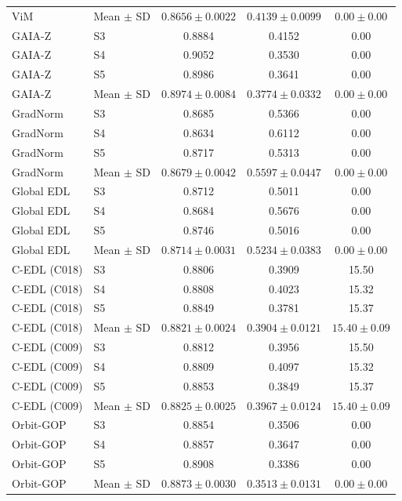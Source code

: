 \begin{longtable}{@{}llccc@{}}
ViM & Mean $\pm$ SD & $0.8656 \pm 0.0022$ & $0.4139 \pm 0.0099$ & $0.00 \pm 0.00$ \\
GAIA-Z & S3 & 0.8884 & 0.4152 & 0.00 \\
GAIA-Z & S4 & 0.9052 & 0.3530 & 0.00 \\
GAIA-Z & S5 & 0.8986 & 0.3641 & 0.00 \\
GAIA-Z & Mean $\pm$ SD & $0.8974 \pm 0.0084$ & $0.3774 \pm 0.0332$ & $0.00 \pm 0.00$ \\
GradNorm & S3 & 0.8685 & 0.5366 & 0.00 \\
GradNorm & S4 & 0.8634 & 0.6112 & 0.00 \\
GradNorm & S5 & 0.8717 & 0.5313 & 0.00 \\
GradNorm & Mean $\pm$ SD & $0.8679 \pm 0.0042$ & $0.5597 \pm 0.0447$ & $0.00 \pm 0.00$ \\
Global EDL & S3 & 0.8712 & 0.5011 & 0.00 \\
Global EDL & S4 & 0.8684 & 0.5676 & 0.00 \\
Global EDL & S5 & 0.8746 & 0.5016 & 0.00 \\
Global EDL & Mean $\pm$ SD & $0.8714 \pm 0.0031$ & $0.5234 \pm 0.0383$ & $0.00 \pm 0.00$ \\
C-EDL (C018) & S3 & 0.8806 & 0.3909 & 15.50 \\
C-EDL (C018) & S4 & 0.8808 & 0.4023 & 15.32 \\
C-EDL (C018) & S5 & 0.8849 & 0.3781 & 15.37 \\
C-EDL (C018) & Mean $\pm$ SD & $0.8821 \pm 0.0024$ & $0.3904 \pm 0.0121$ & $15.40 \pm 0.09$ \\
C-EDL (C009) & S3 & 0.8812 & 0.3956 & 15.50 \\
C-EDL (C009) & S4 & 0.8809 & 0.4097 & 15.32 \\
C-EDL (C009) & S5 & 0.8853 & 0.3849 & 15.37 \\
C-EDL (C009) & Mean $\pm$ SD & $0.8825 \pm 0.0025$ & $0.3967 \pm 0.0124$ & $15.40 \pm 0.09$ \\
Orbit-GOP & S3 & 0.8854 & 0.3506 & 0.00 \\
Orbit-GOP & S4 & 0.8857 & 0.3647 & 0.00 \\
Orbit-GOP & S5 & 0.8908 & 0.3386 & 0.00 \\
Orbit-GOP & Mean $\pm$ SD & $0.8873 \pm 0.0030$ & $0.3513 \pm 0.0131$ & $0.00 \pm 0.00$ \\
\end{longtable}
\endgroup

\clearpage
